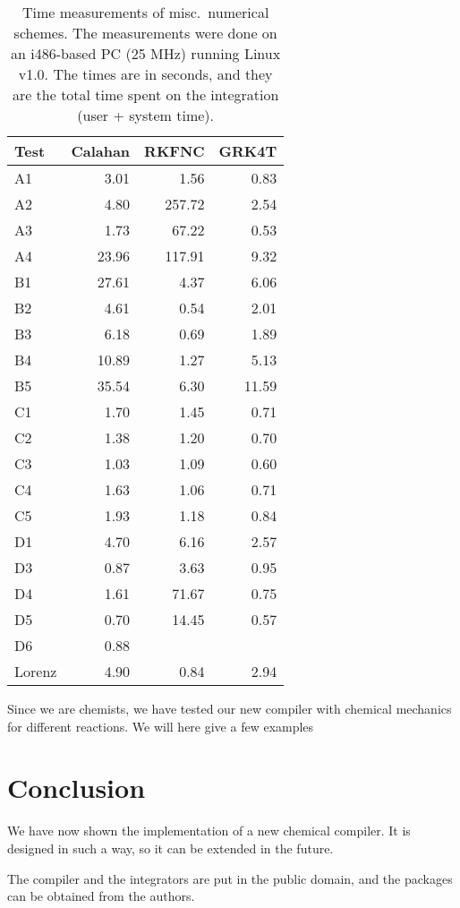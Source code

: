 \begin{table}[htbp]
  \begin{center}
    \leavevmode
    \begin{tabular}{lrrr}
      \hline
      Test & Calahan & RKFNC   & GRK4T  \\ \hline
      A1   & 3.01    & 1.56    & 0.83   \\
      A2   & 4.80    & 257.72  & 2.54   \\
      A3   & 1.73    & 67.22   & 0.53   \\
      A4   & 23.96   & 117.91  & 9.32   \\
      B1   & 27.61   & 4.37    & 6.06   \\
      B2   & 4.61    & 0.54    & 2.01   \\
      B3   & 6.18    & 0.69    & 1.89   \\
      B4   & 10.89   & 1.27    & 5.13   \\
      B5   & 35.54   & 6.30    & 11.59  \\
      C1   & 1.70    & 1.45    & 0.71   \\
      C2   & 1.38    & 1.20    & 0.70   \\
      C3   & 1.03    & 1.09    & 0.60   \\
      C4   & 1.63    & 1.06    & 0.71   \\
      C5   & 1.93    & 1.18    & 0.84   \\
      D1   & 4.70    & 6.16    & 2.57   \\
      D3   & 0.87    & 3.63    & 0.95   \\
      D4   & 1.61    & 71.67   & 0.75   \\
      D5   & 0.70    & 14.45   & 0.57   \\
      D6   & 0.88    &    &        \\
      Lorenz & 4.90  & 0.84  & 2.94   \\
    \hline
    \end{tabular}
  \end{center}
  \caption{Time measurements of misc.\ numerical schemes. The
    measurements were done on an i486-based PC (25 MHz) running Linux
    v1.0. The times are in seconds, and they are the total time spent
    on the integration (user + system time).}
  \label{tab:TimeNumScheme}
\end{table}

Since we are chemists, we have tested our new compiler with chemical
mechanics for different reactions. We will here give a few examples



\section{Conclusion}
We have now shown the implementation of a new chemical compiler. It is
designed in such a way, so it can be extended in the future. 

The compiler and the integrators are put in the public domain, and the
packages can be obtained from the authors. 

%




